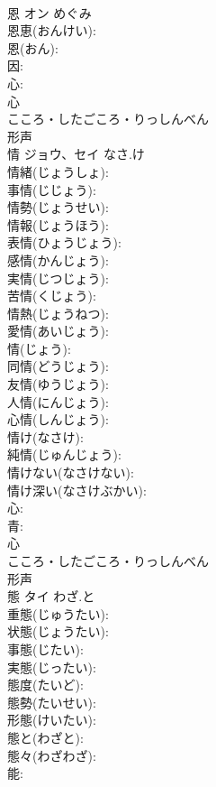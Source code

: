 \documentclass[8pt]{extreport}
\begin{document}
\begin{CJK}{UTF8}{min}
\\	恩	オン		めぐみ	
\\	恩恵(おんけい): 
\\	恩(おん): 
\\	因: 
\\	心: 
\\	心	
\\	こころ・したごころ・りっしんべん	
\\	形声 
\\	情	ジョウ、セイ	なさ.け		
\\	情緒(じょうしょ): 
\\	事情(じじょう): 
\\	情勢(じょうせい): 
\\	情報(じょうほう): 
\\	表情(ひょうじょう): 
\\	感情(かんじょう): 
\\	実情(じつじょう): 
\\	苦情(くじょう): 
\\	情熱(じょうねつ): 
\\	愛情(あいじょう): 
\\	情(じょう): 
\\	同情(どうじょう): 
\\	友情(ゆうじょう): 
\\	人情(にんじょう): 
\\	心情(しんじょう): 
\\	情け(なさけ): 
\\	純情(じゅんじょう): 
\\	情けない(なさけない): 
\\	情け深い(なさけぶかい): 
\\	心: 
\\	青: 
\\	心	
\\	こころ・したごころ・りっしんべん	
\\	形声 
\\	態	タイ	わざ.と		
\\	重態(じゅうたい): 
\\	状態(じょうたい): 
\\	事態(じたい): 
\\	実態(じったい): 
\\	態度(たいど): 
\\	態勢(たいせい): 
\\	形態(けいたい): 
\\	態と(わざと): 
\\	態々(わざわざ): 
\\	能: 

\end{CJK}
\end{document}
